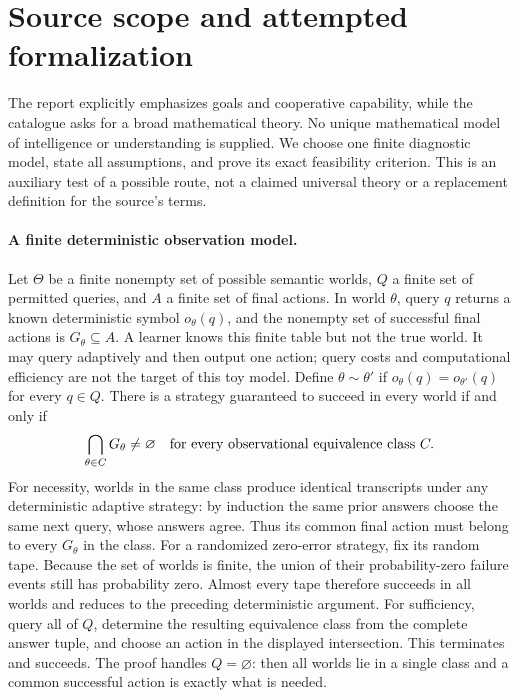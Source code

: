 \documentclass[11pt]{article}
\begin{document}
\section{Source scope and attempted formalization}
The report explicitly emphasizes goals and cooperative capability, while the
catalogue asks for a broad mathematical theory. No unique mathematical model
of intelligence or understanding is supplied. We choose one finite diagnostic
model, state all assumptions, and prove its exact feasibility criterion. This
is an auxiliary test of a possible route, not a claimed universal theory or a
replacement definition for the source's terms.

\paragraph{A finite deterministic observation model.}
Let $\Theta$ be a finite nonempty set of possible semantic worlds, $Q$ a
finite set of permitted queries, and $A$ a finite set of final actions.
In world $\theta$, query $q$ returns a known deterministic symbol
$o_\theta(q)$, and the nonempty set of successful final actions is
$G_\theta\subseteq A$. A learner knows this finite table but not the true
world. It may query adaptively and then output one action; query costs and
computational efficiency are not the target of this toy model.
Define $\theta\sim\theta'$ if
$o_\theta(q)=o_{\theta'}(q)$ for every $q\in Q$.
There is a strategy guaranteed to succeed in every world if and only if
\[
\bigcap_{\theta\in C}G_\theta\ne\varnothing
\quad\hbox{for every observational equivalence class }C.
\]
For necessity, worlds in the same class produce identical transcripts under
any deterministic adaptive strategy: by induction the same prior answers
choose the same next query, whose answers agree. Thus its common final action
must belong to every $G_\theta$ in the class.
For a randomized zero-error strategy, fix its random tape. Because the set of
worlds is finite, the union of their probability-zero failure events still
has probability zero. Almost every tape therefore succeeds in all worlds and
reduces to the preceding deterministic argument. For sufficiency, query all
of $Q$, determine the resulting equivalence class from the complete answer
tuple, and choose an action in the displayed intersection. This terminates
and succeeds. The proof handles $Q=\varnothing$: then all worlds lie in a
single class and a common successful action is exactly what is needed.
\end{document}
